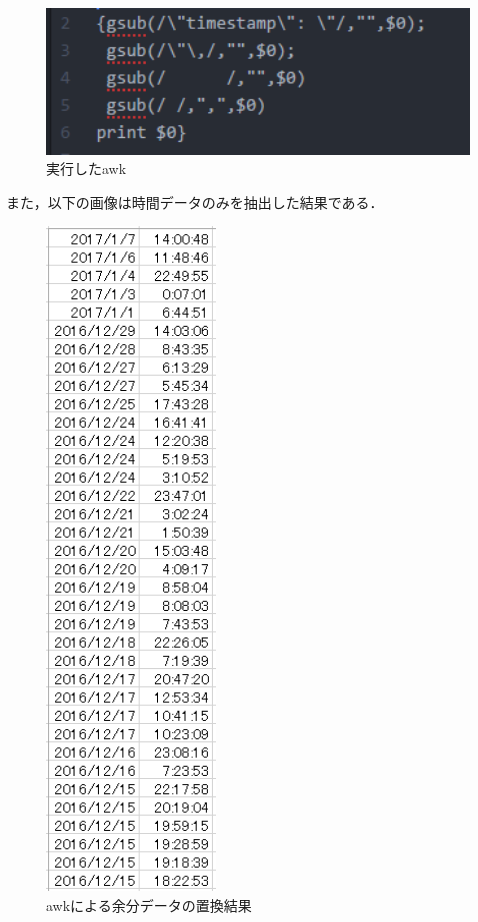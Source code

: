 \begin{figure}[htb]
\centering
\includegraphics[width=13cm]{gsub.PNG}
\caption{実行したawk}\label{g3}
\end{figure}

\newpage

また，以下の画像は時間データのみを抽出した結果である．

\begin{figure}[htb]
\centering
\includegraphics[width=4.5cm]{awk.PNG}
\caption{awkによる余分データの置換結果}\label{awk}
\end{figure}

